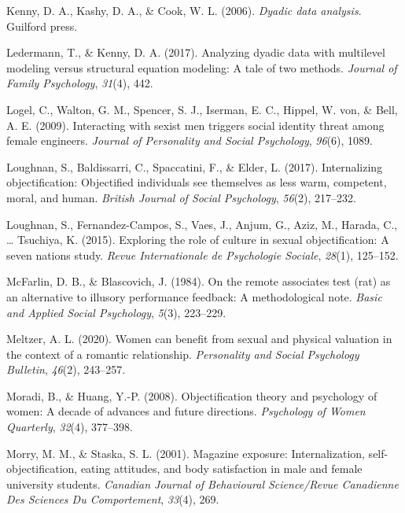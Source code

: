 \documentclass[man]{apa6}
\begin{document}
\hypertarget{ref-kenny2006dyadic}{}
Kenny, D. A., Kashy, D. A., \& Cook, W. L. (2006). \emph{Dyadic data
analysis}. Guilford press.

\hypertarget{ref-ledermann2017analyzing}{}
Ledermann, T., \& Kenny, D. A. (2017). Analyzing dyadic data with
multilevel modeling versus structural equation modeling: A tale of two
methods. \emph{Journal of Family Psychology}, \emph{31}(4), 442.

\hypertarget{ref-logel2009interacting}{}
Logel, C., Walton, G. M., Spencer, S. J., Iserman, E. C., Hippel, W.
von, \& Bell, A. E. (2009). Interacting with sexist men triggers social
identity threat among female engineers. \emph{Journal of Personality and
Social Psychology}, \emph{96}(6), 1089.

\hypertarget{ref-loughnan2017internalizing}{}
Loughnan, S., Baldissarri, C., Spaccatini, F., \& Elder, L. (2017).
Internalizing objectification: Objectified individuals see themselves as
less warm, competent, moral, and human. \emph{British Journal of Social
Psychology}, \emph{56}(2), 217--232.

\hypertarget{ref-loughnan2015exploring}{}
Loughnan, S., Fernandez-Campos, S., Vaes, J., Anjum, G., Aziz, M.,
Harada, C., \ldots{} Tsuchiya, K. (2015). Exploring the role of culture
in sexual objectification: A seven nations study. \emph{Revue
Internationale de Psychologie Sociale}, \emph{28}(1), 125--152.

\hypertarget{ref-mcfarlin1984remote}{}
McFarlin, D. B., \& Blascovich, J. (1984). On the remote associates test
(rat) as an alternative to illusory performance feedback: A
methodological note. \emph{Basic and Applied Social Psychology},
\emph{5}(3), 223--229.

\hypertarget{ref-meltzer2020women}{}
Meltzer, A. L. (2020). Women can benefit from sexual and physical
valuation in the context of a romantic relationship. \emph{Personality
and Social Psychology Bulletin}, \emph{46}(2), 243--257.

\hypertarget{ref-moradi2008}{}
Moradi, B., \& Huang, Y.-P. (2008). Objectification theory and
psychology of women: A decade of advances and future directions.
\emph{Psychology of Women Quarterly}, \emph{32}(4), 377--398.

\hypertarget{ref-morry2001magazine}{}
Morry, M. M., \& Staska, S. L. (2001). Magazine exposure:
Internalization, self-objectification, eating attitudes, and body
satisfaction in male and female university students. \emph{Canadian
Journal of Behavioural Science/Revue Canadienne Des Sciences Du
Comportement}, \emph{33}(4), 269.
\end{document}

